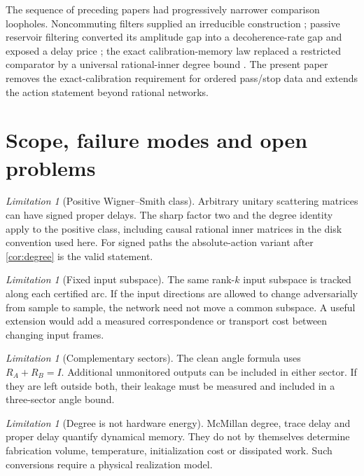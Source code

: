 \documentclass[11pt]{article}
\theoremstyle{definition}
\theoremstyle{remark}
\newtheorem{limitation}[theorem]{Limitation}
\begin{document}
The sequence of preceding papers had progressively narrower comparison
loopholes.  Noncommuting filters supplied an irreducible construction
\cite{ErikssonMIMO2026}; passive reservoir filtering converted its amplitude
gap into a decoherence-rate gap and exposed a delay price
\cite{ErikssonReservoir2026}; the exact calibration-memory law replaced a
restricted comparator by a universal rational-inner degree bound
\cite{ErikssonMemory2026}.  The present paper removes the exact-calibration
requirement for ordered pass/stop data and extends the action statement
beyond rational networks.

\section{Scope, failure modes and open problems}

\begin{limitation}[Positive Wigner--Smith class]
Arbitrary unitary scattering matrices can have signed proper delays.  The
sharp factor two and the degree identity apply to the positive class,
including causal rational inner matrices in the disk convention used here.
For signed paths the absolute-action variant after \cref{cor:degree} is the
valid statement.
\end{limitation}

\begin{limitation}[Fixed input subspace]
The same rank-$k$ input subspace is tracked along each certified arc.  If the
input directions are allowed to change adversarially from sample to sample,
the network need not move a common subspace.  A useful extension would add a
measured correspondence or transport cost between changing input frames.
\end{limitation}

\begin{limitation}[Complementary sectors]
The clean angle formula uses $R_A+R_B=I$.  Additional unmonitored outputs can
be included in either sector.  If they are left outside both, their leakage
must be measured and included in a three-sector angle bound.
\end{limitation}

\begin{limitation}[Degree is not hardware energy]
McMillan degree, trace delay and proper delay quantify dynamical memory.
They do not by themselves determine fabrication volume, temperature,
initialization cost or dissipated work.  Such conversions require a physical
realization model.
\end{limitation}
\end{document}
